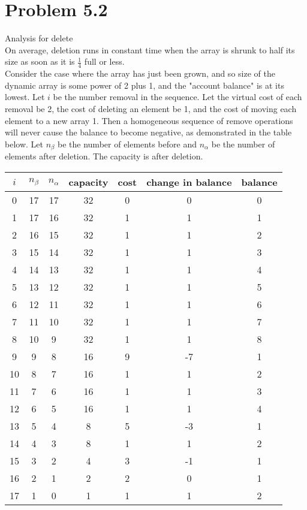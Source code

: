 \documentclass[12pt,letterpaper]{article}
\newcommand\hwnum{5}                  %
\newenvironment{answer}[2]{
  \section*{Problem \hwnum.#1}
}{\newpage}
\begin{document}
\begin{answer}{2}

\textbf{Analysis for delete} \\

On average, deletion runs in constant time when the array is shrunk to half its size as soon as it is $\frac{1}{4}$ full or less.\\

Consider the case where the array has just been grown, and so size of the dynamic array is some power of 2 plus 1, and the "account balance" is at its lowest. Let $i$ be the number removal in the sequence. Let the virtual cost of each removal be 2, the cost of deleting an element be 1, and the cost of moving each element to a new array 1. Then a homogeneous sequence of remove operations will never cause the balance to become negative, as demonstrated in the table below. Let $n_\beta$ be the number of elements before and $n_\alpha$ be the number of elements after deletion. The capacity is after deletion.\\

\begin{tabular}{c|c|c|c|c|c|c}
$i$ & $n_\beta$ & $n_\alpha$ & capacity & cost & change in balance & balance \\ \hline
0 & 17 &17& 32 & 0 & 0 & 0\\
1 & 17 &16& 32 & 1 & 1 & 1\\
2 & 16 &15& 32 & 1 & 1 & 2\\
3 & 15 &14& 32 & 1 & 1 & 3\\
4 & 14 &13& 32 & 1 & 1 & 4\\
5 & 13 &12& 32 & 1 & 1 & 5\\
6 & 12 &11& 32 & 1 & 1 & 6\\
7 & 11 &10& 32 & 1 & 1 & 7\\
8 & 10 &9& 32 & 1 & 1 & 8\\
9 & 9 &8& 16 & 9 & -7 & 1\\
10 & 8 &7& 16 & 1 & 1 & 2\\
11 & 7 &6& 16 & 1 & 1 & 3\\
12 & 6 &5& 16 & 1 & 1 & 4\\
13 & 5 &4& 8 & 5 & -3 & 1\\
14 & 4 &3& 8 & 1 & 1 & 2\\
15 & 3 &2& 4 & 3 & -1 & 1\\
16 & 2 &1& 2 & 2 & 0 & 1\\
17 & 1 &0& 1 & 1 & 1 & 2\\
\end{tabular}\\\\


\end{answer}
\end{document}
